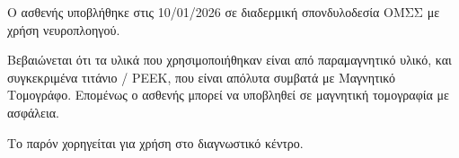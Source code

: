 \documentclass[10pt,greek]{article}
\begin{document}
\begin{PatientInfo}
\end{PatientInfo}

Ο ασθενής υποβλήθηκε στις 10/01/2026 σε διαδερμική σπονδυλοδεσία ΟΜΣΣ με χρήση νευροπλοηγού.

Βεβαιώνεται ότι τα υλικά που χρησιμοποιήθηκαν είναι από παραμαγνητικό υλικό, και συγκεκριμένα τιτάνιο / PEEK, που είναι απόλυτα συμβατά με Μαγνητικό Τομογράφο. Επομένως ο ασθενής μπορεί να υποβληθεί σε μαγνητική τομογραφία με ασφάλεια.

Το παρόν χορηγείται για χρήση στο διαγνωστικό κέντρο.
\end{document}
